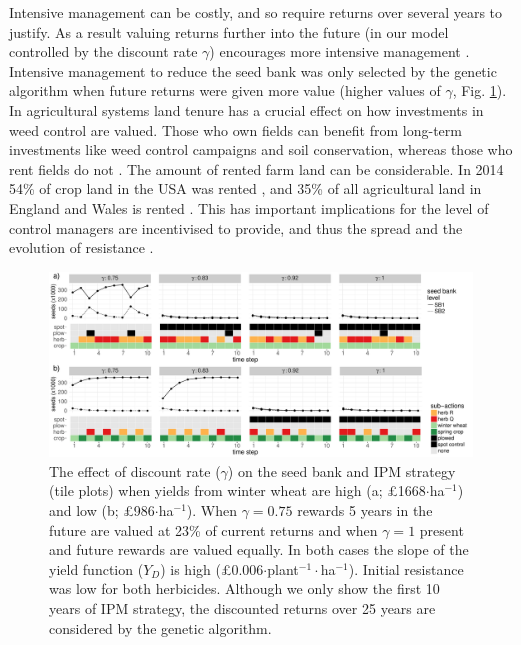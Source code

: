 \documentclass[9pt,twocolumn,twoside,lineno]{pnas-new}
\begin{document}
Intensive management can be costly, and so require returns over several years to justify. As a result valuing returns further into the future (in our model controlled by the discount rate $\gamma$) encourages more intensive management \citep{EpanN2010}. Intensive management to reduce the seed bank was only selected by the genetic algorithm when future returns were given more value (higher values of $\gamma$, Fig. \ref{fig:dis_rate}). In agricultural systems land tenure has a crucial effect on how investments in weed control are valued. Those who own fields can benefit from long-term investments like weed control campaigns and soil conservation, whereas those who rent fields do not \citep{Wies1996, Fras2004}. The amount of rented farm land can be considerable. In 2014 54\% of crop land in the USA was rented \citep{Bige2016}, and 35\% of all agricultural land in England and Wales is rented \citep{CAAV2017}. This has important implications for the level of control managers are incentivised to provide, and thus the spread and the evolution of resistance \citep{Mare2012}.       
\begin{figure}
	\includegraphics[width=178mm]{dis_rate_SB_strat.pdf}
	\caption{The effect of discount rate ($\gamma$) on the seed bank and IPM strategy (tile plots) when yields from winter wheat are high (a; \pounds 1668$\cdot$ha$^{-1}$) and low (b; \pounds 986$\cdot$ha$^{-1}$). When $\gamma = 0.75$ rewards 5 years in the future are valued at 23\% of current returns and when $\gamma = 1$ present and future rewards are valued equally. In both cases the slope of the yield function ($Y_D$) is high (\pounds 0.006$\cdot$plant$^{-1}\cdot$ha$^{-1}$). Initial resistance was low for both herbicides. Although we only show the first 10 years of IPM strategy, the discounted returns over 25 years are considered by the genetic algorithm.}
	\label{fig:dis_rate} 
\end{figure}
\end{document}
